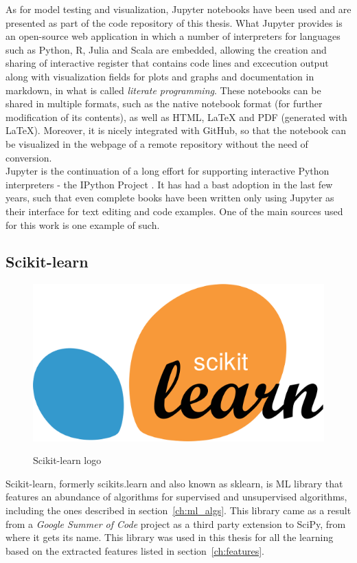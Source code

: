 As for model testing and visualization, Jupyter notebooks \cite{Jupyter} have been used and are presented as part of the code repository of this thesis. What Jupyter provides is an open-source web application in which a number of interpreters for languages such as Python, R, Julia and Scala are embedded, allowing the creation and sharing of interactive register that contains code lines and excecution output along with visualization fields for plots and graphs and documentation in markdown, in what is called \emph{literate programming}. These notebooks can be shared in multiple formats, such as the native notebook format (for further modification of its contents), as well as HTML, \LaTeX{} and PDF (generated with \LaTeX). Moreover, it is nicely integrated with GitHub, so that the notebook can be visualized in the webpage of a remote repository without the need of conversion.\\

Jupyter is the continuation of a long effort for supporting interactive Python interpreters - the IPython Project \cite{IPython}. It has had a bast adoption in the last few years, such that even complete books have been written only using Jupyter as their interface for text editing and code examples. One of the main sources used for this work \cite{Andreas} is one example of such.

\subsection{Scikit-learn}
\begin{figure}[!h]
    \centering
    \includegraphics[width=0.4\linewidth]{figures/sklearn_logo}
    \label{fig:sklearn_logo}
    \caption{Scikit-learn logo}
\end{figure}
Scikit-learn, formerly scikits.learn and also known as sklearn, is \ac{ML} library that features an abundance of algorithms for supervised and unsupervised algorithms, including the ones described in section~\ref{ch:ml_algs}. This library came as a result from a \emph{Google Summer of Code} project as a third party extension to SciPy, from where it gets its name. This library was used in this thesis for all the learning based on the extracted features listed in section~\ref{ch:features}.


